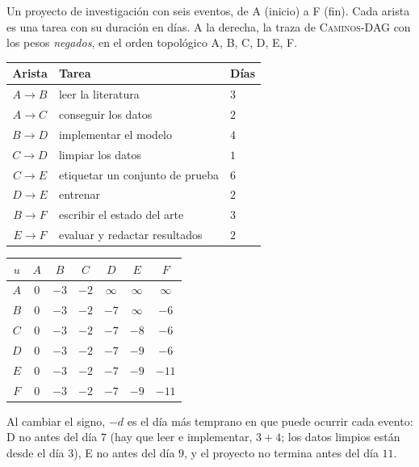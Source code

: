 \documentclass[11pt,letterpaper]{article}
\begin{document}
\begin{ejemplo}\label{ej:ruta-critica-pert}
  Un proyecto de investigación con seis eventos, de A (inicio) a F
  (fin). Cada arista es una tarea con su duración en días. A la
  derecha, la traza de \textsc{Caminos-DAG} con los pesos
  \emph{negados}, en el orden topológico A, B, C, D, E, F.
  \begin{center}
  \small
  \begin{tabular}{cll}
    \toprule
    \textbf{Arista} & \textbf{Tarea} & \textbf{Días} \\
    \midrule
    $A \to B$ & leer la literatura & $3$ \\
    $A \to C$ & conseguir los datos & $2$ \\
    $B \to D$ & implementar el modelo & $4$ \\
    $C \to D$ & limpiar los datos & $1$ \\
    $C \to E$ & etiquetar un conjunto de prueba & $6$ \\
    $D \to E$ & entrenar & $2$ \\
    $B \to F$ & escribir el estado del arte & $3$ \\
    $E \to F$ & evaluar y redactar resultados & $2$ \\
    \bottomrule
  \end{tabular}
  \hspace{0.6cm}
  \begin{tabular}{ccccccc}
    \toprule
    $u$ & $A$ & $B$ & $C$ & $D$ & $E$ & $F$ \\
    \midrule
    $A$ & $0$ & $-3$ & $-2$ & $\infty$ & $\infty$ & $\infty$ \\
    $B$ & $0$ & $-3$ & $-2$ & $-7$ & $\infty$ & $-6$ \\
    $C$ & $0$ & $-3$ & $-2$ & $-7$ & $-8$ & $-6$ \\
    $D$ & $0$ & $-3$ & $-2$ & $-7$ & $-9$ & $-6$ \\
    $E$ & $0$ & $-3$ & $-2$ & $-7$ & $-9$ & $-11$ \\
    $F$ & $0$ & $-3$ & $-2$ & $-7$ & $-9$ & $-11$ \\
    \bottomrule
  \end{tabular}
  \end{center}
  Al cambiar el signo, $-d$ es el día más temprano en que puede
  ocurrir cada evento: D no antes del día $7$ (hay que leer e
  implementar, $3 + 4$; los datos limpios están desde el día $3$), E
  no antes del día $9$, y el proyecto no termina antes del día $11$.
  \begin{center}

\end{center}
\end{ejemplo}
\end{document}

